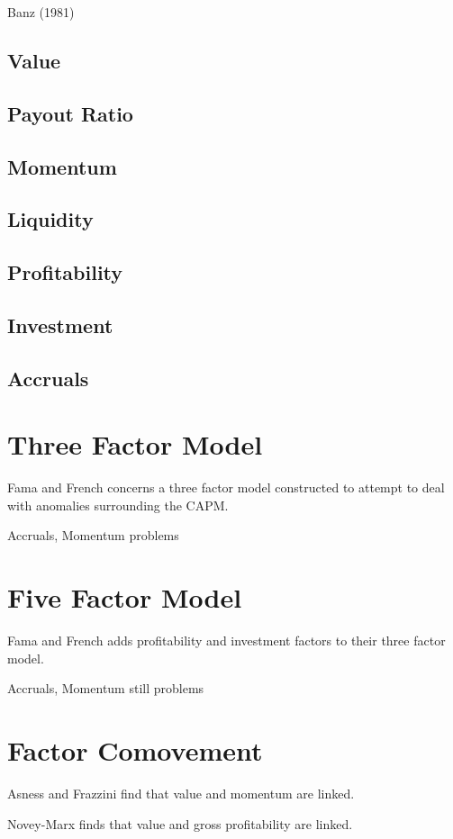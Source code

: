 Banz (1981)\cite{banz1981relationship}

\subsection{Value}

\subsection{Payout Ratio}

\subsection{Momentum}

\subsection{Liquidity}

\subsection{Profitability}

\subsection{Investment}

\subsection{Accruals}

\section{Three Factor Model}

Fama and French\cite{fama1993common} concerns a three factor model constructed
to attempt to deal with anomalies surrounding the CAPM.

Accruals, Momentum problems

\section{Five Factor Model}

Fama and French\cite{fama2016dissecting} adds profitability and investment
factors to their three factor model.

Accruals, Momentum still problems

\section{Factor Comovement}

Asness and Frazzini\cite{asness2013devil} find that value and momentum are
linked.

Novey-Marx\cite{novy2013other} finds that value and gross profitability are
linked.
